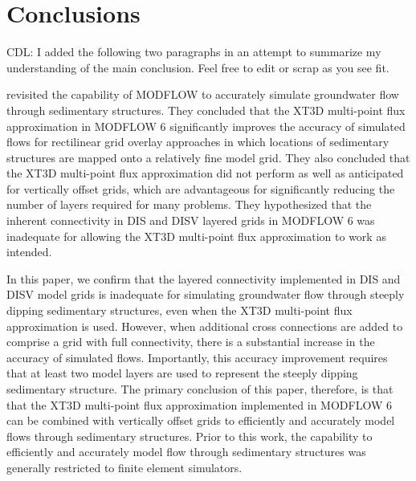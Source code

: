 \documentclass{article}
\begin{document}
\section{Conclusions}

 {\color{red} CDL: I added the following two paragraphs in an attempt to summarize my understanding of the main conclusion.  Feel free to edit or scrap as you see fit.}

\cite{bardot2022} revisited the capability of MODFLOW to accurately simulate groundwater flow through sedimentary structures.  They concluded that the XT3D multi-point flux approximation in MODFLOW 6 significantly improves the accuracy of simulated flows for rectilinear grid overlay approaches in which locations of sedimentary structures are mapped onto a relatively fine model grid.  They also concluded that the XT3D multi-point flux approximation did not perform as well as anticipated for vertically offset grids, which are advantageous for significantly reducing the number of layers required for many problems.  They hypothesized that the inherent connectivity in DIS and DISV layered grids in MODFLOW 6 was inadequate for allowing the XT3D multi-point flux approximation to work as intended.

In this paper, we confirm that the layered connectivity implemented in DIS and DISV model grids is inadequate for simulating groundwater flow through steeply dipping sedimentary structures, even when the XT3D multi-point flux approximation is used.  However, when additional cross connections are added to comprise a grid with full connectivity, there is a substantial increase in the accuracy of simulated flows.  Importantly, this accuracy improvement requires that at least two model layers are used to represent the steeply dipping sedimentary structure.  The primary conclusion of this paper, therefore, is that that the XT3D multi-point flux approximation implemented in MODFLOW 6 can be combined with vertically offset grids to efficiently and accurately model flows through sedimentary structures.  Prior to this work, the capability to efficiently and accurately model flow through sedimentary structures was generally restricted to finite element simulators.
\end{document}
